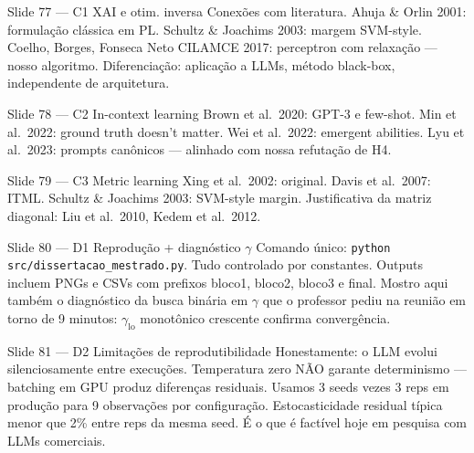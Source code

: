 \documentclass[aspectratio=169,10pt]{beamer}
\begin{document}
\begin{frame}{Slide 77 --- C1 XAI e otim. inversa}
\footnotesize
Conex\~oes com literatura. Ahuja \& Orlin 2001: formula\c{c}\~ao cl\'assica em PL. Schultz \& Joachims 2003: margem SVM-style. Coelho, Borges, Fonseca Neto CILAMCE 2017: perceptron com relaxa\c{c}\~ao --- nosso algoritmo. Diferencia\c{c}\~ao: aplica\c{c}\~ao a LLMs, m\'etodo black-box, independente de arquitetura.
\end{frame}

\begin{frame}{Slide 78 --- C2 In-context learning}
\footnotesize
Brown et al.\ 2020: GPT-3 e few-shot. Min et al.\ 2022: ground truth doesn't matter. Wei et al.\ 2022: emergent abilities. Lyu et al.\ 2023: prompts can\^onicos --- alinhado com nossa refuta\c{c}\~ao de H4.
\end{frame}

\begin{frame}{Slide 79 --- C3 Metric learning}
\footnotesize
Xing et al.\ 2002: original. Davis et al.\ 2007: ITML. Schultz \& Joachims 2003: SVM-style margin. Justificativa da matriz diagonal: Liu et al.\ 2010, Kedem et al.\ 2012.
\end{frame}

\begin{frame}{Slide 80 --- D1 Reprodu\c{c}\~ao + diagn\'ostico $\gamma$}
\footnotesize
Comando \'unico: \texttt{python src/dissertacao\_mestrado.py}. Tudo controlado por constantes. Outputs incluem PNGs e CSVs com prefixos bloco1, bloco2, bloco3 e final. Mostro aqui tamb\'em o diagn\'ostico da busca bin\'aria em $\gamma$ que o professor pediu na reuni\~ao em torno de 9 minutos: $\gamma_{\text{lo}}$ monot\^onico crescente confirma converg\^encia.
\end{frame}

\begin{frame}{Slide 81 --- D2 Limita\c{c}\~oes de reprodutibilidade}
\footnotesize
Honestamente: o LLM evolui silenciosamente entre execu\c{c}\~oes. Temperatura zero N\~AO garante determinismo --- batching em GPU produz diferen\c{c}as residuais. Usamos 3 seeds vezes 3 reps em produ\c{c}\~ao para 9 observa\c{c}\~oes por configura\c{c}\~ao. Estocasticidade residual t\'ipica menor que 2\% entre reps da mesma seed. \'E o que \'e fact\'ivel hoje em pesquisa com LLMs comerciais.
\end{frame}
\end{document}
